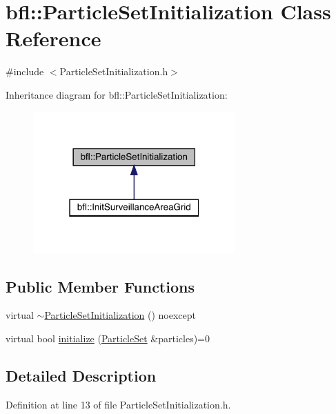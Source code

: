 \hypertarget{classbfl_1_1ParticleSetInitialization}{}\section{bfl\+:\+:Particle\+Set\+Initialization Class Reference}
\label{classbfl_1_1ParticleSetInitialization}


{\ttfamily \#include $<$Particle\+Set\+Initialization.\+h$>$}



Inheritance diagram for bfl\+:\+:Particle\+Set\+Initialization\+:
\nopagebreak
\begin{figure}[H]
\begin{center}
\leavevmode
\includegraphics[width=220pt]{classbfl_1_1ParticleSetInitialization__inherit__graph}
\end{center}
\end{figure}
\subsection*{Public Member Functions}
\begin{DoxyCompactItemize}
\item 
virtual \mbox{\hyperlink{classbfl_1_1ParticleSetInitialization_aa85a3a2b0b7300311696d64f5221636e}{$\sim$\+Particle\+Set\+Initialization}} () noexcept
\item 
virtual bool \mbox{\hyperlink{classbfl_1_1ParticleSetInitialization_a2e4a2a62f8bf9863a75cb83ad9e35f7d}{initialize}} (\mbox{\hyperlink{classbfl_1_1ParticleSet}{Particle\+Set}} \&particles)=0
\end{DoxyCompactItemize}


\subsection{Detailed Description}


Definition at line 13 of file Particle\+Set\+Initialization.\+h.



